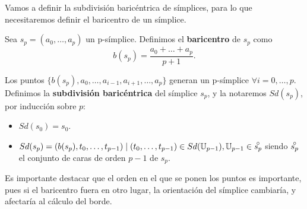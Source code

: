 Vamos a definir la subdivisión baricéntrica de símplices, para lo que necesitaremos
definir el baricentro de un símplice.

\begin{definition}
  Sea $s_p = (a_0, \dots, a_p)$ un p-símplice. Definimos el \textbf{baricentro} de $s_p$ como
  \[b(s_p) = \frac{a_0 + \dots + a_p}{p+1}.\]
\end{definition}

Los puntos $\{b(s_p), a_0, \dots, a_{i-1}, a_{i+1}, \dots, a_p\}$ generan un p-símplice $\forall i = 0, \dots, p$.
Definimos la \textbf{subdivisión baricéntrica} del símplice $s_p$, y la notaremos $Sd(s_p)$, por inducción sobre $p$:
\begin{itemize}
  \item $Sd(s_0) = s_0$.
  \item $Sd(s_p) = (b(s_p), t_0, \dots, t_{p-1}) \mid (t_0, \dots, t_{p-1}) \in Sd(\U_{p-1}), \U_{p-1} \in \interior{s_p}$
        siendo $\interior{s_p}$ el conjunto de caras de orden $p-1$ de $s_p$.
\end{itemize}

\begin{remark}
  Es importante destacar que el orden en el que se ponen los puntos es importante, pues si el baricentro fuera en otro lugar,
  la orientación del símplice cambiaría, y afectaría al cálculo del borde.
\end{remark}

